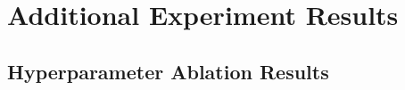 










\section{Additional Experiment Results}
\subsection{Hyperparameter Ablation Results}
\label{app: hyper_ablation}

